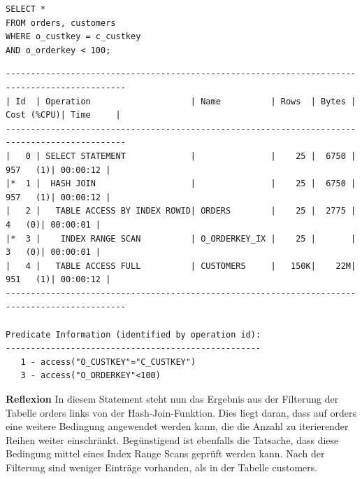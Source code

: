 \documentclass[10pt]{article}
\begin{document}
\begin{lstlisting}[style=sql]
SELECT *
FROM orders, customers
WHERE o_custkey = c_custkey
AND o_orderkey < 100;
\end{lstlisting}
\begin{lstlisting}[style=queryexecutionplan]
----------------------------------------------------------------------------------------------
| Id  | Operation                    | Name          | Rows  | Bytes | Cost (%CPU)| Time     |
----------------------------------------------------------------------------------------------
|   0 | SELECT STATEMENT             |               |    25 |  6750 |   957   (1)| 00:00:12 |
|*  1 |  HASH JOIN                   |               |    25 |  6750 |   957   (1)| 00:00:12 |
|   2 |   TABLE ACCESS BY INDEX ROWID| ORDERS        |    25 |  2775 |     4   (0)| 00:00:01 |
|*  3 |    INDEX RANGE SCAN          | O_ORDERKEY_IX |    25 |       |     3   (0)| 00:00:01 |
|   4 |   TABLE ACCESS FULL          | CUSTOMERS     |   150K|    22M|   951   (1)| 00:00:12 |
----------------------------------------------------------------------------------------------
 
Predicate Information (identified by operation id):
---------------------------------------------------
   1 - access("O_CUSTKEY"="C_CUSTKEY")
   3 - access("O_ORDERKEY"<100)
\end{lstlisting}
\textbf{Reflexion} \newline
In diesem Statement steht nun das Ergebnis aus der Filterung der Tabelle orders links von der Hash-Join-Funktion.
Dies liegt daran, dass auf orders eine weitere Bedingung angewendet werden kann, die die Anzahl zu iterierender Reihen weiter einschränkt. Begünstigend ist ebenfalls die Tatsache, dass diese Bedingung mittel eines Index Range Scans geprüft werden kann.
Nach der Filterung sind weniger Einträge vorhanden, als in der Tabelle customers.
\end{document}
